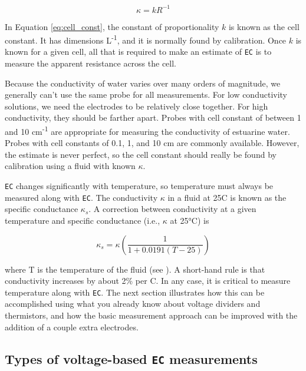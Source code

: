 \begin{equation}\label{eq:cell_const}
	\kappa= kR^{-1}
\end{equation}
 
In Equation \ref{eq:cell_const}, the constant of proportionality $k$ is known as the cell constant.  It has dimensions L\textsuperscript{-1}, and it is normally found by calibration. Once $k$ is known for a given cell, all that is required to make an estimate of \texttt{EC} is to measure the apparent resistance across the cell.  

Because the conductivity of water varies over many orders of magnitude, we generally can’t use the same probe for all measurements.  For low conductivity solutions, we need the electrodes to be relatively close together.  For high conductivity, they should be farther apart.  Probes with cell constant of between 1 and 10 cm\textsuperscript{-1} are appropriate for measuring the conductivity of estuarine water.  Probes with cell constants of 0.1, 1, and 10 cm are commonly available.  However, the estimate is never perfect, so the cell constant should really be found by calibration using a fluid with known $\kappa$.

\texttt{EC} changes significantly with temperature, so temperature must always be measured along with \texttt{EC}. The conductivity $\kappa$ in a fluid at 25\textdegree C is known as the specific conductance $\kappa_s$.  A correction between conductivity at a given temperature and specific conductance (i.e., $\kappa$ at 25°C) is

\begin{equation}\label{eq:ec_temp}
	\kappa_s = \kappa\left (\frac{1}{1+0.0191\left ( T-25 \right )}\right )
\end{equation}

where T is the temperature of the fluid (see ).  A short-hand rule is that conductivity increases by about 2\% per \textdegree C.  In any case, it is critical to measure temperature along with \texttt{EC}. The next section illustrates how this can be accomplished using what you already know about voltage dividers and thermistors, and how the basic measurement approach can be improved with the addition of a couple extra electrodes.

\subsection{Types of voltage-based \texttt{EC} measurements}

